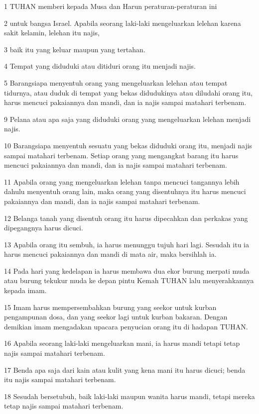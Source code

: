 \par 1 TUHAN memberi kepada Musa dan Harun peraturan-peraturan ini
\par 2 untuk bangsa Israel. Apabila seorang laki-laki mengeluarkan lelehan karena sakit kelamin, lelehan itu najis,
\par 3 baik itu yang keluar maupun yang tertahan.
\par 4 Tempat yang diduduki atau ditiduri orang itu menjadi najis.
\par 5 Barangsiapa menyentuh orang yang mengeluarkan lelehan atau tempat tidurnya, atau duduk di tempat yang bekas didudukinya atau diludahi orang itu, harus mencuci pakaiannya dan mandi, dan ia najis sampai matahari terbenam.
\par 9 Pelana atau apa saja yang diduduki orang yang mengeluarkan lelehan menjadi najis.
\par 10 Barangsiapa menyentuh sesuatu yang bekas diduduki orang itu, menjadi najis sampai matahari terbenam. Setiap orang yang mengangkat barang itu harus mencuci pakaiannya dan mandi, dan ia najis sampai matahari terbenam.
\par 11 Apabila orang yang mengeluarkan lelehan tanpa mencuci tangannya lebih dahulu menyentuh orang lain, maka orang yang disentuhnya itu harus mencuci pakaiannya dan mandi, dan ia najis sampai matahari terbenam.
\par 12 Belanga tanah yang disentuh orang itu harus dipecahkan dan perkakas yang dipegangnya harus dicuci.
\par 13 Apabila orang itu sembuh, ia harus menunggu tujuh hari lagi. Sesudah itu ia harus mencuci pakaiannya dan mandi di mata air, maka bersihlah ia.
\par 14 Pada hari yang kedelapan ia harus membawa dua ekor burung merpati muda atau burung tekukur muda ke depan pintu Kemah TUHAN lalu menyerahkannya kepada imam.
\par 15 Imam harus mempersembahkan burung yang seekor untuk kurban pengampunan dosa, dan yang seekor lagi untuk kurban bakaran. Dengan demikian imam mengadakan upacara penyucian orang itu di hadapan TUHAN.
\par 16 Apabila seorang laki-laki mengeluarkan mani, ia harus mandi tetapi tetap najis sampai matahari terbenam.
\par 17 Benda apa saja dari kain atau kulit yang kena mani itu harus dicuci; benda itu najis sampai matahari terbenam.
\par 18 Sesudah bersetubuh, baik laki-laki maupun wanita harus mandi, tetapi mereka tetap najis sampai matahari terbenam.
